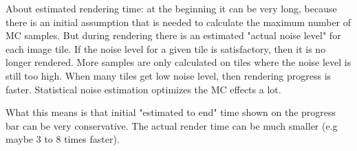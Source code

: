 About estimated rendering time: at the beginning it can be very long, because there is an initial assumption that is needed to calculate the maximum number of MC samples. But during rendering there is an estimated "actual noise level" for each image tile. If the noise level for a given tile is satisfactory, then it is no longer rendered. More samples are only calculated on tiles where the noise level is still too high. When many tiles get low noise level, then rendering progress is faster. Statistical noise estimation optimizes the MC effects a lot.

What this means is that initial "estimated to end" time shown on the progress bar can be very conservative. The actual render time can be much smaller (e.g maybe 3 to 8 times faster).
